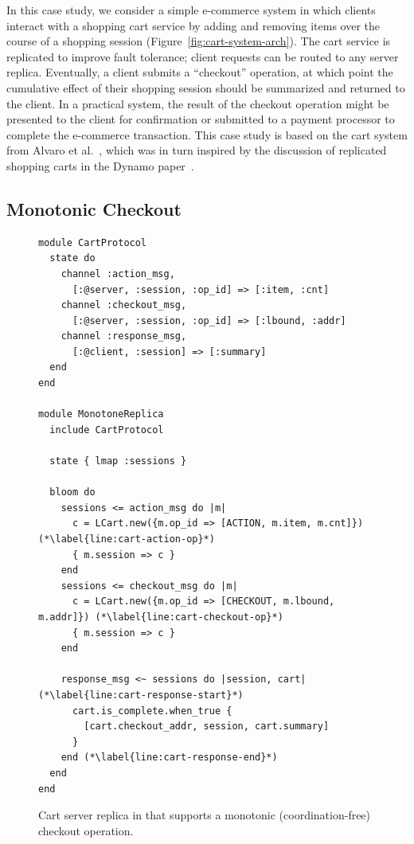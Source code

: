 In this case study, we consider a simple e-commerce system in which clients
interact with a shopping cart service by adding and removing items over the
course of a shopping session (Figure~\ref{fig:cart-system-arch}). The cart
service is replicated to improve fault tolerance; client requests can be routed
to any server replica. Eventually, a client submits a ``checkout'' operation, at
which point the cumulative effect of their shopping session should be summarized
and returned to the client. In a practical system, the result of the checkout
operation might be presented to the client for confirmation or submitted to a
payment processor to complete the e-commerce transaction. This case study is
based on the cart system from Alvaro et al.~\cite{Alvaro2011}, which was in turn
inspired by the discussion of replicated shopping carts in the Dynamo
paper~\cite{DeCandia2007}.


\subsection{Monotonic Checkout}
\label{sec:monotone-checkout}

\begin{figure}[t]
\begin{scriptsize}
\begin{lstlisting}
module CartProtocol
  state do
    channel :action_msg,
      [:@server, :session, :op_id] => [:item, :cnt]
    channel :checkout_msg,
      [:@server, :session, :op_id] => [:lbound, :addr]
    channel :response_msg,
      [:@client, :session] => [:summary]
  end
end

module MonotoneReplica
  include CartProtocol

  state { lmap :sessions }

  bloom do
    sessions <= action_msg do |m|
      c = LCart.new({m.op_id => [ACTION, m.item, m.cnt]}) (*\label{line:cart-action-op}*)
      { m.session => c }
    end
    sessions <= checkout_msg do |m|
      c = LCart.new({m.op_id => [CHECKOUT, m.lbound, m.addr]}) (*\label{line:cart-checkout-op}*)
      { m.session => c }
    end

    response_msg <~ sessions do |session, cart| (*\label{line:cart-response-start}*)
      cart.is_complete.when_true {
        [cart.checkout_addr, session, cart.summary]
      }
    end (*\label{line:cart-response-end}*)
  end
end
\end{lstlisting}
\end{scriptsize}
\caption{Cart server replica in \lang that supports a monotonic
  (coordination-free) checkout operation.}
\label{fig:monotone-cart}
\end{figure}

